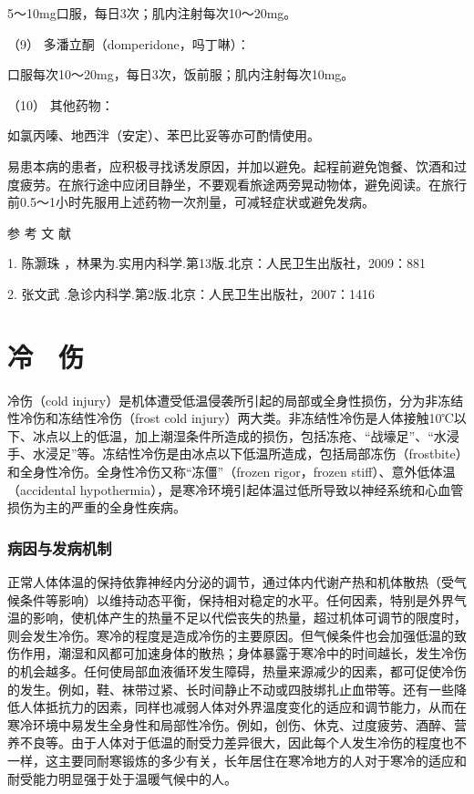 5～10mg口服，每日3次；肌内注射每次10～20mg。

\hypertarget{text00356.htmlux5cux23CHP15-2-3-2-9}{}
（9） 多潘立酮（domperidone，吗丁啉）：

口服每次10～20mg，每日3次，饭前服；肌内注射每次10mg。

\hypertarget{text00356.htmlux5cux23CHP15-2-3-2-10}{}
（10） 其他药物：

如氯丙嗪、地西泮（安定）、苯巴比妥等亦可酌情使用。

易患本病的患者，应积极寻找诱发原因，并加以避免。起程前避免饱餐、饮酒和过度疲劳。在旅行途中应闭目静坐，不要观看旅途两旁晃动物体，避免阅读。在旅行前0.5～1小时先服用上述药物一次剂量，可减轻症状或避免发病。

\protect\hypertarget{text00357.html}{}{}

\hypertarget{text00357.htmlux5cux23CHP15-2-4}{}
参 考 文 献

1. 陈灏珠 ，林果为.实用内科学.第13版.北京：人民卫生出版社，2009：881

2. 张文武 .急诊内科学.第2版.北京：人民卫生出版社，2007：1416

\protect\hypertarget{text00358.html}{}{}

\chapter{冷　伤}

冷伤（cold
injury）是机体遭受低温侵袭所引起的局部或全身性损伤，分为非冻结性冷伤和冻结性冷伤（frost
cold
injury）两大类。非冻结性冷伤是人体接触10℃以下、冰点以上的低温，加上潮湿条件所造成的损伤，包括冻疮、“战壕足”、“水浸手、水浸足”等。冻结性冷伤是由冰点以下低温所造成，包括局部冻伤（frostbite）和全身性冷伤。全身性冷伤又称“冻僵”（frozen
rigor，frozen stiff）、意外低体温（accidental
hypothermia），是寒冷环境引起体温过低所导致以神经系统和心血管损伤为主的严重的全身性疾病。

\subsection{病因与发病机制}

正常人体体温的保持依靠神经内分泌的调节，通过体内代谢产热和机体散热（受气候条件等影响）以维持动态平衡，保持相对稳定的水平。任何因素，特别是外界气温的影响，使机体产生的热量不足以代偿丧失的热量，超过机体可调节的限度时，则会发生冷伤。寒冷的程度是造成冷伤的主要原因。但气候条件也会加强低温的致伤作用，潮湿和风都可加速身体的散热；身体暴露于寒冷中的时间越长，发生冷伤的机会越多。任何使局部血液循环发生障碍，热量来源减少的因素，都可促使冷伤的发生。例如，鞋、袜带过紧、长时间静止不动或四肢绑扎止血带等。还有一些降低人体抵抗力的因素，同样也减弱人体对外界温度变化的适应和调节能力，从而在寒冷环境中易发生全身性和局部性冷伤。例如，创伤、休克、过度疲劳、酒醉、营养不良等。由于人体对于低温的耐受力差异很大，因此每个人发生冷伤的程度也不一样，这主要同耐寒锻炼的多少有关，长年居住在寒冷地方的人对于寒冷的适应和耐受能力明显强于处于温暖气候中的人。


